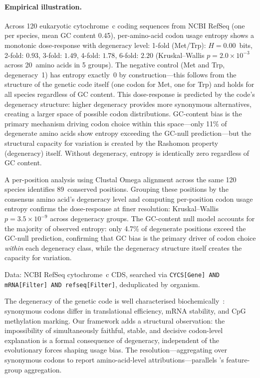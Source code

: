 \paragraph{Empirical illustration.}
Across 120 eukaryotic cytochrome~c coding sequences from NCBI RefSeq
(one per species, mean GC content 0.45), per-amino-acid codon usage entropy
shows a monotonic dose-response with degeneracy level: 1-fold (Met/Trp):
$H = 0.00$~bits, 2-fold: $0.93$, 3-fold: $1.49$, 4-fold: $1.78$,
6-fold: $2.20$ (Kruskal--Wallis $p = 2.0 \times 10^{-3}$ across 20~amino
acids in 5 groups).  The negative control (Met and Trp, degeneracy~1) has
entropy exactly~0 by construction---this follows from the structure of the
genetic code itself (one codon for Met, one for Trp) and holds for all
species regardless of GC content.
This dose-response is predicted by the code's degeneracy structure: higher
degeneracy provides more synonymous alternatives, creating a larger space
of possible codon distributions.  GC-content bias is the primary mechanism
driving codon choice within this space---only 11\% of degenerate amino
acids show entropy exceeding the GC-null prediction---but the structural
capacity for variation is created by the Rashomon property (degeneracy)
itself.  Without degeneracy, entropy is identically zero regardless of
GC content.

A per-position analysis using Clustal Omega alignment across the same 120
species identifies 89~conserved positions.  Grouping these positions by the
consensus amino acid's degeneracy level and computing per-position codon
usage entropy confirms the dose-response at finer resolution:
Kruskal--Wallis $p = 3.5 \times 10^{-9}$ across degeneracy groups.  The
GC-content null model accounts for the majority of observed entropy: only
4.7\% of degenerate positions exceed the GC-null prediction, confirming
that GC bias is the primary driver of codon choice \emph{within} each
degeneracy class, while the degeneracy structure itself creates the
capacity for variation.

\noindent Data: NCBI RefSeq cytochrome~c CDS, searched via
\texttt{CYCS[Gene] AND mRNA[Filter] AND refseq[Filter]}, deduplicated by
organism.

The degeneracy of the genetic code is well characterised biochemically~\cite{sharp1987nucleotide, hershberg2008selection}: synonymous codons differ in translational efficiency, mRNA stability, and CpG methylation marking. Our framework adds a structural observation: the impossibility of simultaneously faithful, stable, and decisive codon-level explanation is a formal consequence of degeneracy, independent of the evolutionary forces shaping usage bias. The resolution---aggregating over synonymous codons to report amino-acid-level attributions---parallels \DASH{}'s feature-group aggregation.

